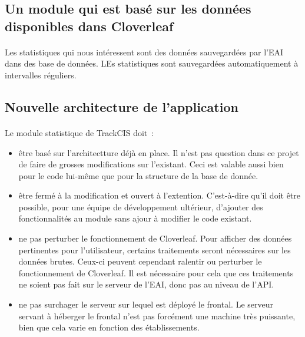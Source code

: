 		\subsection{Un module qui est basé sur les données disponibles dans
		Cloverleaf}
			\paragraph{}
			Les statistiques qui nous intéressent sont des données sauvegardées par l'EAI
			dans des base de données. LEs statistiques sont sauvegardées automatiquement
			à intervalles réguliers.
		
		
		\subsection{Nouvelle architecture de l'application}
			\paragraph{}%
			Le module statistique de TrackCIS doit~:
			\begin{itemize}%
			  \item être basé sur l'architectture déjà en place. Il n'est pas question
			  dans ce projet de faire de grosses modifications sur l'existant. Ceci est
			  valable aussi bien pour le code lui-même que pour la structure de la base
			  de donnée.
			  \item être fermé à la modification et ouvert à l'extention. C'est-à-dire
			  qu'il doit être possible, pour une équipe de développement ultérieur,
			  d'ajouter des fonctionnalités au module sans ajour à modifier le code
			  existant.
			  \item ne pas perturber le fonctionnement de Cloverleaf. Pour afficher des
			  données pertinentes pour l'utilisateur, certains traitements seront
			  nécessaires sur les données brutes. Ceux-ci peuvent cependant ralentir ou
			  perturber le fonctionnement de Cloverleaf. Il est nécessaire pour cela que
			  ces traitements ne soient pas fait sur le serveur de l'EAI, donc pas au
			  niveau de l'API.
			  \item ne pas surchager le serveur sur lequel est déployé le frontal. Le
			  serveur servant à héberger le frontal n'est pas forcément une machine très
			  puissante, bien que cela varie en fonction des établissements.
			\end{itemize}
			
